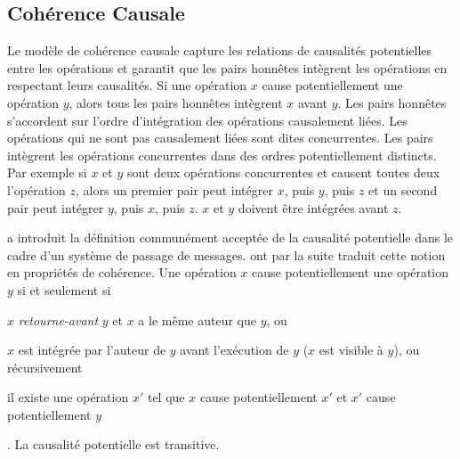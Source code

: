 \subsection{Cohérence Causale}\label{subsec:caucal-consistency}

Le modèle de cohérence causale capture les relations de causalités potentielles entre les opérations et garantit que les pairs honnêtes intègrent les opérations en respectant leurs causalités.
Si une opération $x$ cause potentiellement une opération $y$, alors tous les pairs honnêtes intègrent $x$ avant $y$.
Les pairs honnêtes s'accordent sur l'ordre d'intégration des opérations causalement liées.
Les opérations qui ne sont pas causalement liées sont dites concurrentes.
Les pairs intègrent les opérations concurrentes dans des ordres potentiellement distincts.
Par exemple si $x$ et $y$ sont deux opérations concurrentes et causent toutes deux l'opération $z$, alors un premier pair peut intégrer $x$, puis $y$, puis $z$ et un second pair peut intégrer $y$, puis $x$, puis $z$.
$x$ et $y$ doivent être intégrées avant $z$.

\textcite{lamport_1978_time} a introduit la définition communément acceptée de la causalité potentielle dans le cadre d'un système de passage de messages.
\textcite{hutto_1990_causal} ont par la suite traduit cette notion en propriétés de cohérence.
Une opération $x$ cause potentiellement une opération $y$ si et seulement si \begin{inlinelist}
    \item $x$ \emph{retourne-avant} $y$ et $x$ a le même auteur que $y$, ou
    \item $x$ est intégrée par l'auteur de $y$ avant l'exécution de $y$ ($x$ est visible à $y$), ou récursivement
    \item il existe une opération $x'$ tel que $x$ cause potentiellement $x'$ et $x'$ cause potentiellement $y$
\end{inlinelist}.
La causalité potentielle est transitive.

